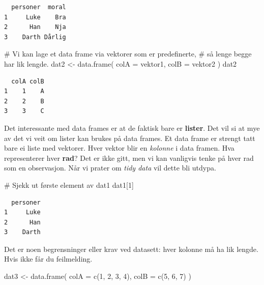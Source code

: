 \documentclass[
  letterpaper,
  DIV=11,
  numbers=noendperiod]{scrreprt}
\newenvironment{Shaded}{\begin{snugshade}}{\end{snugshade}}
\newcommand{\AttributeTok}[1]{\textcolor[rgb]{0.40,0.45,0.13}{#1}}
\newcommand{\CommentTok}[1]{\textcolor[rgb]{0.37,0.37,0.37}{#1}}
\newcommand{\DecValTok}[1]{\textcolor[rgb]{0.68,0.00,0.00}{#1}}
\newcommand{\FunctionTok}[1]{\textcolor[rgb]{0.28,0.35,0.67}{#1}}
\newcommand{\NormalTok}[1]{\textcolor[rgb]{0.00,0.23,0.31}{#1}}
\newcommand{\OtherTok}[1]{\textcolor[rgb]{0.00,0.23,0.31}{#1}}
\begin{document}
\begin{verbatim}
  personer  moral
1     Luke    Bra
2      Han    Nja
3    Darth Dårlig
\end{verbatim}

\begin{Shaded}
\begin{Highlighting}[]
\CommentTok{\# Vi kan lage et data frame via vektorer som er predefinerte,}
\CommentTok{\# så lenge begge har lik lengde.}
\NormalTok{dat2 }\OtherTok{\textless{}{-}} \FunctionTok{data.frame}\NormalTok{(}
  \AttributeTok{colA =}\NormalTok{ vektor1,}
  \AttributeTok{colB =}\NormalTok{ vektor2}
\NormalTok{)}
\NormalTok{dat2}
\end{Highlighting}
\end{Shaded}

\begin{verbatim}
  colA colB
1    1    A
2    2    B
3    3    C
\end{verbatim}

Det interessante med data frames er at de faktisk bare er
\textbf{lister}. Det vil si at mye av det vi veit om lister kan brukes
på data frames. Et data frame er strengt tatt bare ei liste med
vektorer. Hver vektor blir en \emph{kolonne} i data framen. Hva
representerer hver \textbf{rad}? Det er ikke gitt, men vi kan vanligvis
tenke på hver rad som en observasjon. Når vi prater om \emph{tidy data}
vil dette bli utdypa.

\begin{Shaded}
\begin{Highlighting}[]
\CommentTok{\# Sjekk ut første element av dat1}
\NormalTok{dat1[}\DecValTok{1}\NormalTok{]}
\end{Highlighting}
\end{Shaded}

\begin{verbatim}
  personer
1     Luke
2      Han
3    Darth
\end{verbatim}

Det er noen begrensninger eller krav ved datasett: hver kolonne må ha
lik lengde. Hvis ikke får du feilmelding.

\begin{Shaded}
\begin{Highlighting}[]
\NormalTok{dat3 }\OtherTok{\textless{}{-}} \FunctionTok{data.frame}\NormalTok{(}
  \AttributeTok{colA =} \FunctionTok{c}\NormalTok{(}\DecValTok{1}\NormalTok{, }\DecValTok{2}\NormalTok{, }\DecValTok{3}\NormalTok{, }\DecValTok{4}\NormalTok{),}
  \AttributeTok{colB =} \FunctionTok{c}\NormalTok{(}\DecValTok{5}\NormalTok{, }\DecValTok{6}\NormalTok{, }\DecValTok{7}\NormalTok{)}
\NormalTok{)}
\end{Highlighting}
\end{Shaded}
\end{document}
